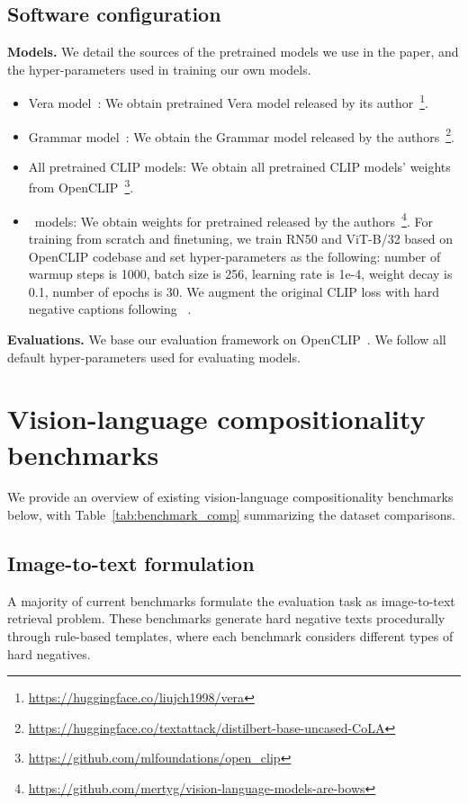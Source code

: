 \subsection{Software configuration}

\textbf{Models.} We detail the sources of the pretrained models we use in the paper, and the hyper-parameters used in training our own models.

\begin{itemize}
    \item Vera model~\cite{liu2023vera}: We obtain pretrained Vera model released by its author~\footnote{\url{https://huggingface.co/liujch1998/vera}}.
    \item Grammar model~\cite{morris2020textattack}: We obtain the Grammar model released by the authors~\footnote{\url{https://huggingface.co/textattack/distilbert-base-uncased-CoLA}}.
    \item All pretrained CLIP models: We obtain all pretrained CLIP models' weights from OpenCLIP~\footnote{\url{https://github.com/mlfoundations/open_clip}}.
    \item \negclip\ models: We obtain weights for pretrained \negclip released by the authors~\footnote{\url{https://github.com/mertyg/vision-language-models-are-bows}}. For training from scratch and finetuning, we train RN50 and ViT-B/32 based on OpenCLIP codebase and set hyper-parameters as the following: number of warmup steps is 1000, batch size is 256, learning rate is 1e-4, weight decay is 0.1, number of epochs is 30. We augment the original CLIP loss with hard negative captions following \negclip~\cite{yuksekgonul2023when}.
\end{itemize}

\textbf{Evaluations.}
We base our evaluation framework on OpenCLIP~\cite{ilharco_gabriel_2021_5143773}. We follow all default hyper-parameters used for evaluating models.



\section{Vision-language compositionality benchmarks}
\label{app:bms}

We provide an overview of existing vision-language compositionality benchmarks below, with Table~\ref{tab:benchmark_comp} summarizing the dataset comparisons.

\subsection{Image-to-text formulation}
A majority of current benchmarks formulate the evaluation task as image-to-text retrieval problem. These benchmarks generate hard negative texts procedurally through rule-based templates, where each benchmark considers different types of hard negatives.

